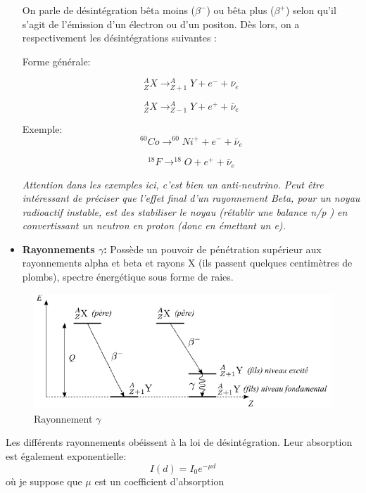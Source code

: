 \begin{itemize}
        
On parle de désintégration bêta moins ($\beta^{-}$) ou bêta plus ($\beta^{+}$) selon qu'il s'agit de l'émission d'un électron ou d'un positon. Dès lors, on a respectivement les désintégrations suivantes :
        
Forme générale: 

    \[
        ^{A}_{Z}X \rightarrow ^{A}_{Z+1}Y + e^- + \bar{\nu}_e
    \]
    
    \[
        ^{A}_{Z}X \rightarrow ^{A}_{Z-1}Y + e^+ + \bar{\nu}_e
    \]

Exemple:
    \[
        ^{60}_{}Co \rightarrow ^{60}_{}Ni^{+} + e^- + \bar{\nu}_e
    \]
    
    \[
        ^{18}_{}F \rightarrow ^{18}_{}O + e^+ + \bar{\nu}_e
    \]
    
    
\textit{ Attention dans les exemples ici, c'est bien un anti-neutrino.
Peut être intéressant de préciser que l'effet final d'un rayonnement Beta, pour un noyau radioactif instable, est des stabiliser le noyau (rétablir une balance n/p ) en convertissant un neutron en proton (donc en émettant un e).}

\item \textbf{Rayonnements $\gamma$:} Possède un pouvoir de pénétration supérieur aux rayonnements alpha et beta et rayons X (ils passent quelques centimètres de plombs), spectre énergétique sous forme de raies. 
\end{itemize}
        
        \begin{figure}[ht]
         \centering
        \includegraphics[scale=0.7]{Images1/gamma.PNG}
        \caption{Rayonnement $\gamma$}
        \end{figure}
Les différents rayonnements obéissent à la loi de désintégration. Leur absorption est également exponentielle: 
    \[
        I(d)=I_0e^{-\mu d}
    \]
où je suppose que $\mu$ est un coefficient d'absorption



